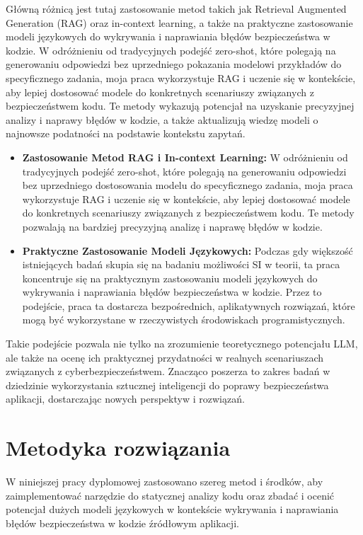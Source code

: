 Główną różnicą jest tutaj zastosowanie metod takich jak Retrieval Augmented Generation (RAG) oraz in-context learning, a także na praktyczne zastosowanie modeli językowych do wykrywania i naprawiania błędów bezpieczeństwa w kodzie. W odróżnieniu od tradycyjnych podejść zero-shot, które polegają na generowaniu odpowiedzi bez uprzedniego pokazania modelowi przykładów do specyficznego zadania, moja praca wykorzystuje RAG i uczenie się w kontekście, aby lepiej dostosować modele do konkretnych scenariuszy związanych z bezpieczeństwem kodu. Te metody wykazują potencjał na uzyskanie precyzyjnej analizy i naprawy błędów w kodzie, a także aktualizują wiedzę modeli o najnowsze podatności na podstawie kontekstu zapytań. 
\begin{itemize}
    \item \textbf{Zastosowanie Metod RAG i In-context Learning:} W odróżnieniu od tradycyjnych podejść zero-shot, które polegają na generowaniu odpowiedzi bez uprzedniego dostosowania modelu do specyficznego zadania, moja praca wykorzystuje RAG i uczenie się w kontekście, aby lepiej dostosować modele do konkretnych scenariuszy związanych z bezpieczeństwem kodu. Te metody pozwalają na bardziej precyzyjną analizę i naprawę błędów w kodzie.
    
    \item \textbf{Praktyczne Zastosowanie Modeli Językowych:} Podczas gdy większość istniejących badań skupia się na badaniu możliwości SI w teorii, ta praca koncentruje się na praktycznym zastosowaniu modeli językowych do wykrywania i naprawiania błędów bezpieczeństwa w kodzie. Przez to podejście, praca ta dostarcza bezpośrednich, aplikatywnych rozwiązań, które mogą być wykorzystane w rzeczywistych środowiskach programistycznych.
\end{itemize}

Takie podejście pozwala nie tylko na zrozumienie teoretycznego potencjału LLM, ale także na ocenę ich praktycznej przydatności w realnych scenariuszach związanych z cyberbezpieczeństwem. Znacząco poszerza to zakres badań w dziedzinie wykorzystania sztucznej inteligencji do poprawy bezpieczeństwa aplikacji, dostarczając nowych perspektyw i rozwiązań.

\chapter{Metodyka rozwiązania}

W niniejszej pracy dyplomowej zastosowano szereg metod i środków, aby zaimplementować narzędzie do statycznej analizy kodu oraz zbadać i ocenić potencjał dużych modeli językowych w kontekście wykrywania i naprawiania błędów bezpieczeństwa w kodzie źródłowym aplikacji.

